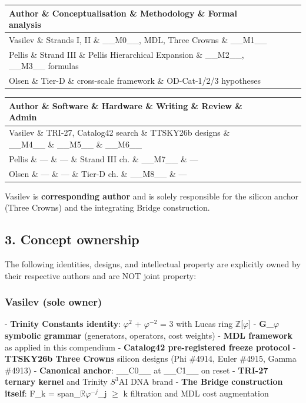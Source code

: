 \begin{table}[H]
\centering
\footnotesize
\setlength{\tabcolsep}{4pt}
\renewcommand{\arraystretch}{1.25}
\begin{tabularx}{\linewidth}{@{}l X X X@{}}
\toprule
\textbf{Author} \& \textbf{Conceptualisation} \& \textbf{Methodology} \& \textbf{Formal analysis} \\
\midrule
Vasilev \& Strands I, II \& \_\_M0\_\_, MDL, Three Crowns \& \_\_M1\_\_ \\
Pellis  \& Strand III    \& Pellis Hierarchical Expansion   \& \_\_M2\_\_, \_\_M3\_\_ formulas \\
Olsen   \& Tier-D        \& cross-scale framework           \& OD-Cat-1/2/3 hypotheses \\
\bottomrule
\end{tabularx}

\vspace{0.4em}

\begin{tabularx}{\linewidth}{@{}l X X c c c@{}}
\toprule
\textbf{Author} \& \textbf{Software} \& \textbf{Hardware} \& \textbf{Writing} \& \textbf{Review} \& \textbf{Admin} \\
\midrule
Vasilev \& TRI-27, Catalog42 search \& TTSKY26b designs \& \_\_M4\_\_ \& \_\_M5\_\_ \& \_\_M6\_\_ \\
Pellis  \& ---                       \& ---               \& Strand III ch.    \& \_\_M7\_\_ \& --- \\
Olsen   \& ---                       \& ---               \& Tier-D ch.        \& \_\_M8\_\_ \& --- \\
\bottomrule
\end{tabularx}
\end{table}

Vasilev is \textbf{corresponding author} and is solely responsible for the silicon anchor (Three Crowns) and the integrating Bridge construction.

\subsection{3. Concept ownership}

The following identities, designs, and intellectual property are explicitly owned by their respective authors and are NOT joint property:

\subsubsection{Vasilev (sole owner)}
- \textbf{Trinity Constants identity}: $\varphi^{2}$ + $\varphi^{-2}$ = 3 with Lucas ring $\mathbb{Z}$[$\varphi$]
- \textbf{G\_$\varphi$ symbolic grammar} (generators, operators, cost weights)
- \textbf{MDL framework} as applied in this compendium
- \textbf{Catalog42 pre-registered freeze protocol}
- \textbf{TTSKY26b Three Crowns} silicon designs (Phi \#4914, Euler \#4915, Gamma \#4913)
- \textbf{Canonical anchor}: \_\_C0\_\_ at \_\_C1\_\_ on reset
- \textbf{TRI-27 ternary kernel} and Trinity $S^{3}$AI DNA brand
- \textbf{The Bridge construction itself}: F\_k = span\_$\mathbb{R}${$\varphi^{-j}$}\_{j $\geq$ k} filtration and MDL cost augmentation

